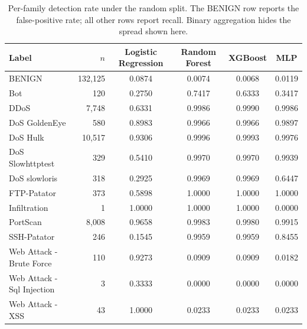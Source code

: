 \begin{table}[htbp]
\centering
\caption{Per-family detection rate under the random split. The BENIGN row reports the false-positive rate; all other rows report recall. Binary aggregation hides the spread shown here.}
\label{tab:family}
\scriptsize
\begin{tabular}{lrcccc}
\hline
Label & $n$ & Logistic Regression & Random Forest & XGBoost & MLP \\
\hline
BENIGN & 132,125 & 0.0874 & 0.0074 & 0.0068 & 0.0119 \\
Bot & 120 & 0.2750 & 0.7417 & 0.6333 & 0.3417 \\
DDoS & 7,748 & 0.6331 & 0.9986 & 0.9990 & 0.9986 \\
DoS GoldenEye & 580 & 0.8983 & 0.9966 & 0.9966 & 0.9897 \\
DoS Hulk & 10,517 & 0.9306 & 0.9996 & 0.9993 & 0.9976 \\
DoS Slowhttptest & 329 & 0.5410 & 0.9970 & 0.9970 & 0.9939 \\
DoS slowloris & 318 & 0.2925 & 0.9969 & 0.9969 & 0.6447 \\
FTP-Patator & 373 & 0.5898 & 1.0000 & 1.0000 & 1.0000 \\
Infiltration & 1 & 1.0000 & 1.0000 & 1.0000 & 0.0000 \\
PortScan & 8,008 & 0.9658 & 0.9983 & 0.9980 & 0.9915 \\
SSH-Patator & 246 & 0.1545 & 0.9959 & 0.9959 & 0.8455 \\
Web Attack - Brute Force & 110 & 0.9273 & 0.0909 & 0.0909 & 0.0182 \\
Web Attack - Sql Injection & 3 & 0.3333 & 0.0000 & 0.0000 & 0.0000 \\
Web Attack - XSS & 43 & 1.0000 & 0.0233 & 0.0233 & 0.0233 \\
\hline
\end{tabular}
\end{table}

